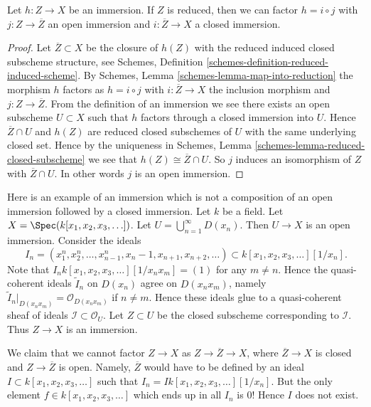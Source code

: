 \begin{lemma}
\label{lemma-factor-reduced-immersion}
Let $h : Z \to X$ be an immersion.
If $Z$ is reduced, then we can factor
$h = i \circ j$ with $j : Z \to \overline{Z}$ an
open immersion and $i : \overline{Z} \to X$ a closed immersion.
\end{lemma}

\begin{proof}
Let $\overline{Z} \subset X$ be the closure of $h(Z)$ with the reduced
induced closed subscheme structure, see
Schemes, Definition \ref{schemes-definition-reduced-induced-scheme}.
By Schemes, Lemma \ref{schemes-lemma-map-into-reduction}
the morphism $h$ factors as
$h = i \circ j$ with $i : \overline{Z} \to X$ the inclusion morphism
and $j : Z \to \overline{Z}$. From the definition of an immersion we
see there exists an open subscheme $U \subset X$ such that
$h$ factors through a closed immersion into $U$. Hence
$\overline{Z} \cap U$ and $h(Z)$ are reduced closed subschemes
of $U$ with the same underlying closed set. Hence by the uniqueness
in Schemes, Lemma \ref{schemes-lemma-reduced-closed-subscheme}
we see that $h(Z) \cong \overline{Z} \cap U$.
So $j$ induces an isomorphism of $Z$ with $\overline{Z} \cap U$.
In other words $j$ is an open immersion.
\end{proof}



\begin{example}
\label{example-thibaut}
Here is an example of an immersion which is not a composition of an
open immersion followed by a closed immersion.
Let $k$ be a field.
Let $X = \Spec(k[x_1, x_2, x_3, \ldots])$.
Let $U = \bigcup_{n = 1}^{\infty} D(x_n)$.
Then $U \to X$ is an open immersion.
Consider the ideals
$$
I_n =
(x_1^n, x_2^n, \ldots, x_{n - 1}^n, x_n - 1, x_{n + 1}, x_{n + 2}, \ldots)
\subset
k[x_1, x_2, x_3, \ldots][1/x_n].
$$
Note that $I_n k[x_1, x_2, x_3, \ldots][1/x_nx_m] = (1)$
for any $m \not = n$. Hence the quasi-coherent ideals
$\widetilde I_n$ on $D(x_n)$ agree on $D(x_nx_m)$, namely
$\widetilde I_n|_{D(x_nx_m)} = \mathcal{O}_{D(x_n x_m)}$ if
$n \not = m$. Hence these ideals glue to a quasi-coherent sheaf of ideals
$\mathcal{I} \subset \mathcal{O}_U$.
Let $Z \subset U$ be the closed subscheme corresponding to
$\mathcal{I}$. Thus $Z \to X$ is an immersion.

\medskip\noindent
We claim that we cannot factor $Z \to X$ as
$Z \to \overline{Z} \to X$, where $\overline{Z} \to X$ is closed
and $Z \to \overline{Z}$ is open. Namely, $\overline{Z}$ would
have to be defined by an ideal $I \subset k[x_1, x_2, x_3, \ldots]$
such that $I_n = I k[x_1, x_2, x_3, \ldots][1/x_n]$.
But the only element $f \in k[x_1, x_2, x_3, \ldots]$
which ends up in all $I_n$ is $0$! Hence $I$ does not exist.
\end{example}

